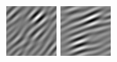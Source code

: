 \begin{figure}
\begin{center}
  \includegraphics[width=\columnwidth/9]{ch4/figures/imag_2_2.jpg}
  \includegraphics[width=\columnwidth/9]{ch4/figures/imag_2_3.jpg}

\end{center}
\end{figure}
